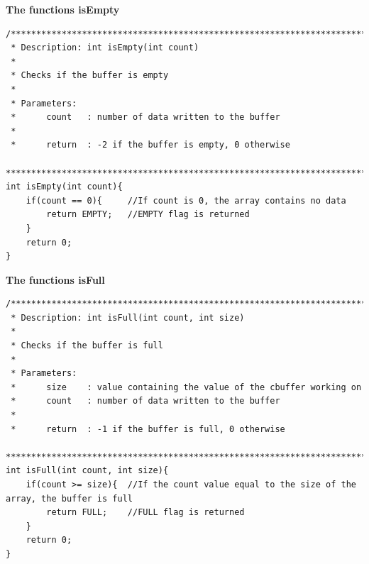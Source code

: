 \newpage
\textbf{The functions isEmpty}
\begin{lstlisting}
/****************************************************************************
 * Description: int isEmpty(int count)
 *
 * Checks if the buffer is empty
 *
 * Parameters:
 * 		count  	: number of data written to the buffer
 *
 *		return	: -2 if the buffer is empty, 0 otherwise
 ***************************************************************************/
int isEmpty(int count){
	if(count == 0){		//If count is 0, the array contains no data
		return EMPTY;	//EMPTY flag is returned
	}
	return 0;
}
\end{lstlisting}

\textbf{The functions isFull}
\begin{lstlisting}
/****************************************************************************
 * Description: int isFull(int count, int size)
 *
 * Checks if the buffer is full
 *
 * Parameters:
 *		size	: value containing the value of the cbuffer working on
 * 		count  	: number of data written to the buffer
 *
 *		return	: -1 if the buffer is full, 0 otherwise
 ***************************************************************************/
int isFull(int count, int size){
	if(count >= size){	//If the count value equal to the size of the array, the buffer is full
		return FULL;	//FULL flag is returned
	}
	return 0;
}
\end{lstlisting}


